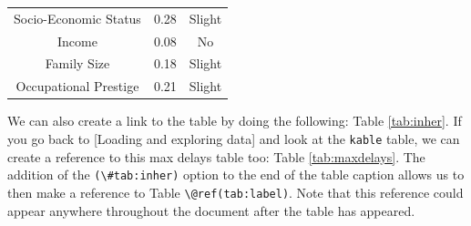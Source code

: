 \documentclass[ms]{uncgdissertationexp}
\theoremstyle{plain}
\theoremstyle{definition}
\theoremstyle{remark}
\begin{document}
\begin{longtable}[]{@{}ccc@{}}
\begin{minipage}[t]{0.29\columnwidth}
  Socio-Economic Status\strut
  \end{minipage} & \begin{minipage}[t]{0.47\columnwidth}\centering\strut
  0.28\strut
  \end{minipage} & \begin{minipage}[t]{0.16\columnwidth}\centering\strut
  Slight\strut
  \end{minipage}\tabularnewline
  \begin{minipage}[t]{0.29\columnwidth}\centering\strut
  Income\strut
  \end{minipage} & \begin{minipage}[t]{0.47\columnwidth}\centering\strut
  0.08\strut
  \end{minipage} & \begin{minipage}[t]{0.16\columnwidth}\centering\strut
  No\strut
  \end{minipage}\tabularnewline
  \begin{minipage}[t]{0.29\columnwidth}\centering\strut
  Family Size\strut
  \end{minipage} & \begin{minipage}[t]{0.47\columnwidth}\centering\strut
  0.18\strut
  \end{minipage} & \begin{minipage}[t]{0.16\columnwidth}\centering\strut
  Slight\strut
  \end{minipage}\tabularnewline
  \begin{minipage}[t]{0.29\columnwidth}\centering\strut
  Occupational Prestige\strut
  \end{minipage} & \begin{minipage}[t]{0.47\columnwidth}\centering\strut
  0.21\strut
  \end{minipage} & \begin{minipage}[t]{0.16\columnwidth}\centering\strut
  Slight\strut
  \end{minipage}\tabularnewline
  \bottomrule
  \end{longtable}
  We can also create a link to the table by doing the following: Table
  \ref{tab:inher}. If you go back to {[}Loading and exploring data{]} and
  look at the \texttt{kable} table, we can create a reference to this max
  delays table too: Table \ref{tab:maxdelays}. The addition of the
  \texttt{(\textbackslash{}\#tab:inher)} option to the end of the table
  caption allows us to then make a reference to Table
  \texttt{\textbackslash{}@ref(tab:label)}. Note that this reference could
  appear anywhere throughout the document after the table has appeared.
  
\end{document}
